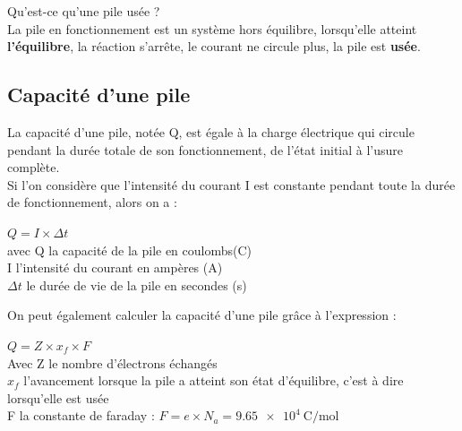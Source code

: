  Qu'est-ce qu'une pile usée ?\\
La pile en fonctionnement est un système hors équilibre, lorsqu'elle atteint \textbf{l'équilibre}, la réaction s'arrête, le courant ne circule plus, la pile est \textbf{usée}.

\subsection{Capacité d'une pile}

La capacité d'une pile, notée Q, est égale à la charge électrique qui circule pendant la durée totale de son fonctionnement, de l'état initial à l'usure complète.\\
Si l'on considère que l'intensité du courant I est constante pendant toute la durée de fonctionnement, alors on a :
\begin{center}
$Q=I\times \Delta t$ \\avec 
Q la capacité de la pile en coulombs(C)\\
I l'intensité du courant en ampères (A)\\
$\Delta t$ le durée de vie de la pile en secondes (s)
\end{center}
On peut également calculer la capacité d'une pile grâce à l'expression :
\begin{center}
$Q=Z\times x_f \times F$\\
Avec Z le nombre d'électrons échangés\\
$x_f$ l'avancement lorsque la pile a atteint son état d'équilibre, c'est à dire lorsqu'elle est usée\\
F la constante de faraday : $F=e\times N_a=\SI{9,65e4}{\coulomb\per\mole}$
\end{center}

